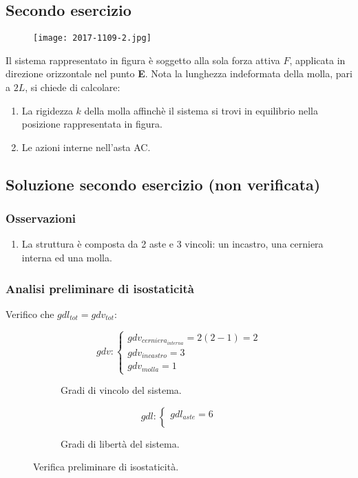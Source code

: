 \documentclass[main.tex]{subfiles}
\begin{document}
\subsection{Secondo esercizio}

\begin{figure}[H]
\centering
\texttt{[image: 2017-1109-2.jpg]}
\end{figure}

Il sistema rappresentato in figura è soggetto alla sola forza attiva $F$, applicata in direzione orizzontale nel punto \textbf{E}.
Nota la lunghezza indeformata della molla, pari a $2L$, si chiede di calcolare:

\begin{enumerate}
\item La rigidezza $k$ della molla affinchè il sistema si trovi in equilibrio nella posizione rappresentata in figura.
\item Le azioni interne nell’asta AC.
\end{enumerate}

\clearpage

\subsection{Soluzione secondo esercizio (non verificata)}

\subsubsection{Osservazioni}

\begin{enumerate}
\item La struttura è composta da 2 aste e 3 vincoli: un incastro, una cerniera interna ed una molla.
\end{enumerate}

\subsubsection{Analisi preliminare di isostaticità}
Verifico che $gdl_{tot} = gdv_{tot}$:
\begin{figure}[H]
  \begin{subfigure}[b]{.5\textwidth}
  \centering
  \[
  	gdv: \begin{cases}
		gdv_{cerniera_{interna}} = 2(2-1)=2\\
		gdv_{incastro} = 3\\
		gdv_{molla} = 1
  	\end{cases}
  \]
  \caption{Gradi di vincolo del sistema.}
  \end{subfigure}
  \hfill
  \begin{subfigure}[b]{.5\textwidth}
  \centering
  \[
  	gdl: \begin{cases}
  		gdl_{aste} = 6\\
  	\end{cases}
  \]
  \caption{Gradi di libertà del sistema.}
  \end{subfigure}
  \caption{Verifica preliminare di isostaticità.}
\end{figure}
\end{document}
